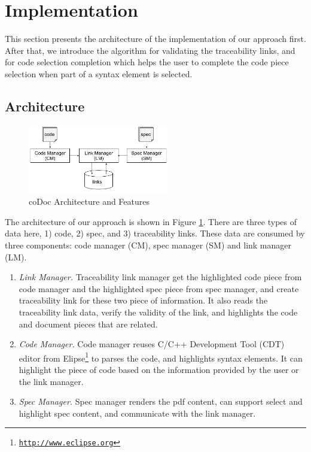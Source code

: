 \section{Implementation}
\label{sec:implementation}

This section presents the architecture of the implementation of our approach first. After that, we introduce the algorithm for validating the traceability links, and for code selection completion which helps the user to complete the code piece selection when part of a syntax element is selected.

\subsection{Architecture}

\begin{figure}
\begin{center}
\includegraphics[width=0.55\textwidth]{architecture}
\caption{coDoc Architecture and Features}
\label{fig:architecture}
\end{center}
\end{figure}

The architecture of our approach is shown in Figure \ref{fig:architecture}. 
There are three types of data here, 1) code, 2) spec, and 3) traceability links.
These data are consumed by three components: code manager (CM), spec manager (SM) and link manager (LM).
\begin{enumerate}
\item \textit{Link Manager.} Traceability link manager get the highlighted code piece from code manager and the highlighted spec piece from spec manager, and create traceability link for these two piece of information. It also reads the traceability link data, verify the validity of the link,
and highlights the code and document pieces that are related.
\item \textit{Code Manager.} Code manager reuses C/C++ Development Tool (CDT) editor from Elipse\footnote{\texttt{\url{http://www.eclipse.org}}} to parses the code, 
and highlights syntax elements. It can highlight the piece of code based on the information provided by the user or the link manager.
\item \textit{Spec Manager.} Spec manager renders the pdf content, can support select and highlight spec content, and communicate with the link manager.
\end{enumerate}

